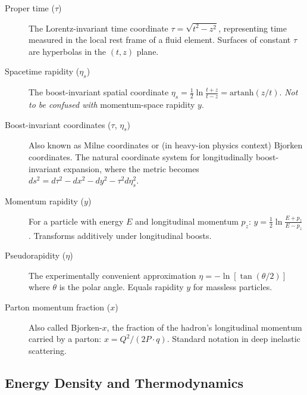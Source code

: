 \documentclass[11pt]{article}
\begin{document}
\begin{description}
\item[Proper time ($\tau$)] The Lorentz-invariant time coordinate $\tau = \sqrt{t^2 - z^2}$, representing time measured in the local rest frame of a fluid element. Surfaces of constant $\tau$ are hyperbolas in the $(t,z)$ plane.

\item[Spacetime rapidity ($\eta_s$)] The boost-invariant spatial coordinate $\eta_s = \frac{1}{2}\ln\frac{t+z}{t-z} = \mathrm{artanh}(z/t)$. \textit{Not to be confused with} momentum-space rapidity $y$.

\item[Boost-invariant coordinates ($\tau$, $\eta_s$)] Also known as Milne coordinates or (in heavy-ion physics context) Bjorken coordinates. The natural coordinate system for longitudinally boost-invariant expansion, where the metric becomes $ds^2 = d\tau^2 - dx^2 - dy^2 - \tau^2 d\eta_s^2$.

\item[Momentum rapidity ($y$)] For a particle with energy $E$ and longitudinal momentum $p_z$: $y = \frac{1}{2}\ln\frac{E+p_z}{E-p_z}$. Transforms additively under longitudinal boosts.

\item[Pseudorapidity ($\eta$)] The experimentally convenient approximation $\eta = -\ln[\tan(\theta/2)]$ where $\theta$ is the polar angle. Equals rapidity $y$ for massless particles.

\item[Parton momentum fraction ($x$)] Also called Bjorken-$x$, the fraction of the hadron's longitudinal momentum carried by a parton: $x = Q^2/(2P \cdot q)$. Standard notation in deep inelastic scattering.
\end{description}

\subsection*{Energy Density and Thermodynamics}
\end{document}
